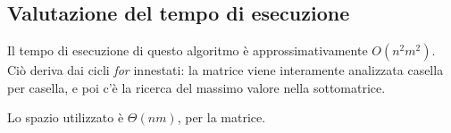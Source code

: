 \documentclass{article}
\begin{document}
\subsection{Valutazione del tempo di esecuzione}
Il tempo di esecuzione di questo algoritmo è approssimativamente $O(n^2m^2)$. Ciò deriva dai cicli \textit{for} innestati: la matrice viene interamente analizzata casella per casella, e poi c'è la ricerca del massimo valore nella sottomatrice.

Lo spazio utilizzato è $\Theta(nm)$, per la matrice.
\end{document}
